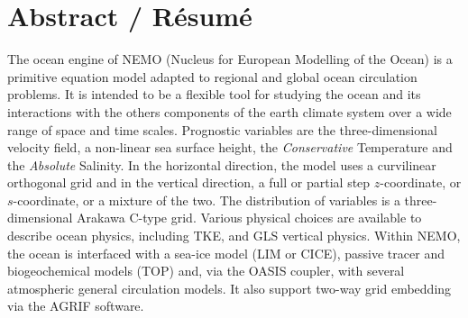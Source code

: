\documentclass[NEMO_book]{subfiles}
\begin{document}

\chapter*{Abstract / R\'{e}sum\'{e}}

\vspace{-40pt}

{\small
The ocean engine of NEMO (Nucleus for European Modelling of the Ocean) is a primitive 
equation model adapted to regional and global ocean circulation problems. It is intended to 
be a flexible tool for studying the ocean and its interactions with the others components of 
the earth climate system over a wide range of space and time scales. 
Prognostic variables are the three-dimensional velocity field, a non-linear sea surface height, 
the \textit{Conservative} Temperature and the \textit{Absolute} Salinity. 
In the horizontal direction, the model uses a curvilinear orthogonal grid and in the vertical direction, 
a full or partial step $z$-coordinate, or $s$-coordinate, or a mixture of the two. 
The distribution of variables is a three-dimensional Arakawa C-type grid. 
Various physical choices are available to describe ocean physics, including TKE, and GLS vertical physics. 
Within NEMO, the ocean is interfaced with a sea-ice model (LIM or CICE), passive tracer and 
biogeochemical models (TOP) and, via the OASIS coupler, with several atmospheric general circulation models. 
It also support two-way grid embedding via the AGRIF software.


} 
\end{document}
